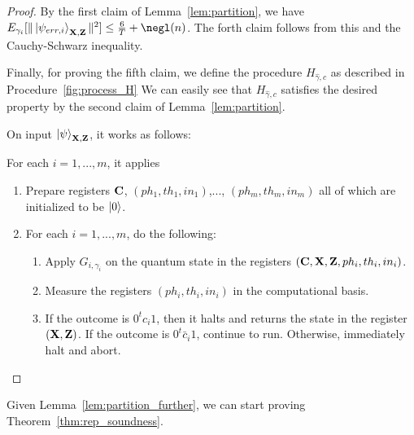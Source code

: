 \begin{proof}
 
By the first claim of  Lemma~\ref{lem:partition}, we have $E_{\gamma_i}[\|\ket{\psi_{err,i}}_{\regX,\regZ}\|^2]\leq \frac{6}{T}+\negl(\secpar)$.
The forth claim follows from this and the Cauchy-Schwarz inequality. 

Finally, for proving the fifth claim, we define the procedure $H_{\hat{\gamma},c}$ as described in Procedure~\ref{fig:process_H}
We can easily see that $H_{\hat{\gamma},c}$ satisfies the desired property by the second claim of  Lemma~\ref{lem:partition}.

\begin{algorithm}[h]
    \begin{mdframed}[style=figstyle,innerleftmargin=10pt,innerrightmargin=10pt]
   On input $\ket{\psi}_{\mathbf{X},\mathbf{Z}}$, it works as follows:
   
   For each $i=1,...,m$, it applies 
    \begin{enumerate}
    \item Prepare registers $\mathbf{C}$, $(ph_1,th_1,in_1)$,..., $(ph_m,th_m,in_m)$ all of which are initialized to be $\ket{0}$.
    \item For each $i=1,...,m$, do the following: 
      \begin{enumerate}
      \item Apply $G_{i,\gamma_i}$ on the quantum state in the registers $(\mathbf{C},\mathbf{X},\mathbf{Z},ph_i,th_i,in_i)$.
      \item Measure the registers $(ph_i,th_i,in_i)$ in the computational basis.
      \item If the outcome is $0^tc_{i}1$, then it halts and returns the state in the register $(\mathbf{X},\mathbf{Z})$. If the outcome is $0^t\bar{c}_{i}1$, continue to run. Otherwise, immediately halt and abort.
      \end{enumerate}   
    \end{enumerate}

    \caption{$H_{\hat{\gamma},c}$}
    \label{fig:process_H}
    \end{mdframed}
\end{algorithm}
\end{proof}

Given Lemma~\ref{lem:partition_further}, we can start proving Theorem~\ref{thm:rep_soundness}. 

